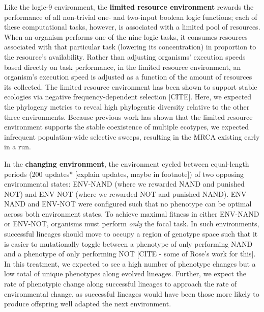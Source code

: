 \documentclass[letterpaper]{article}
\begin{document}
Like the logic-9 environment, the \textbf{limited resource environment} rewards the performance of all non-trivial one- and two-input boolean logic functions; each of these computational tasks, however, is associated with a limited pool of resources. When an organism performs one of the nine logic tasks, it consumes resources associated with that particular task (lowering its concentration) in proportion to the resource's availability. 
Rather than adjusting organisms' execution speeds based directly on task performance, in the limited resource environment, an organism's execution speed is adjusted as a function of the amount of resources its collected.
The limited resource environment has been shown to support stable ecologies via negative frequency-dependent selection [CITE]. 
Here, we expected the phylogeny metrics to reveal high phylogentic diversity relative to the other three environments. 
Because previous work has shown that the limited resource environment supports the stable coexistence of multiple ecotypes, we expected infrequent population-wide selective sweeps, resulting in the MRCA existing early in a run.

In the \textbf{changing environment}, the environment cycled between equal-length periods (200 updates* [explain updates, maybe in footnote]) of two opposing environmental states: ENV-NAND (where we rewarded NAND and punished NOT) and ENV-NOT (where we rewarded NOT and punished NAND). 
ENV-NAND and ENV-NOT were configured such that no phenotype can be optimal across both environment states. To achieve maximal fitness in either ENV-NAND or ENV-NOT, organisms must perform \textit{only} the focal task.
In such environments, successful lineages should move to occupy a region of genotype space such that it is easier to mutationally toggle between a phenotype of only performing NAND and a phenotype of only performing NOT [CITE - some of Rose's work for this].
In this treatment, we expected to see a high number of phenotype changes but a low total of unique phenotypes along evolved lineages.
Further, we expect the rate of phenotypic change along successful lineages to approach the rate of environmental change, as successful lineages would have been those more likely to produce offspring well adapted the next environment.
\end{document}

